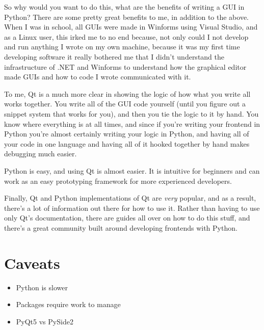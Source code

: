 \documentclass[11pt]{article}
\begin{document}
\begin{notes}
So why would you want to do this, what are the benefits of writing a GUI in Python? There are some pretty great benefits to me, in addition to the above. When I was in school, all GUIs were made in Winforms using Visual Studio, and as a Linux user, this irked me to no end because, not only could I not develop and run anything I wrote on my own machine, because it was my first time developing software it really bothered me that I didn't understand the infrastructure of .NET and Winforms to understand how the graphical editor made GUIs and how to code I wrote communicated with it.

To me, Qt is a much more clear in showing the logic of how what you write all works together. You write all of the GUI code yourself (until you figure out a snippet system that works for you), and then you tie the logic to it by hand. You know where everything is at all times, and since if you're writing your frontend in Python you're almost certainly writing your logic in Python, and having all of your code in one language and having all of it hooked together by hand makes debugging much easier.

Python is easy, and using Qt is almost easier. It is intuitive for beginners and can work as an easy prototyping framework for more experienced developers.

Finally, Qt and Python implementations of Qt are \emph{very} popular, and as a result, there's a lot of information out there for how to use it. Rather than having to use only Qt's documentation, there are guides all over on how to do this stuff, and there's a great community built around developing frontends with Python.
\end{notes}

\section{Caveats}
\label{sec:orgb5caa53}
\begin{itemize}
\item Python is slower
\item Packages require work to manage
\item PyQt5 vs PySide2
\end{itemize}
\end{document}
